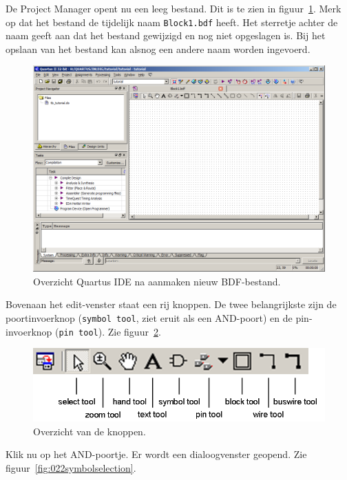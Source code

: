 \documentclass[a4paper,12pt,fleqn,twoside]{book}
\def\tutpicscale{0.455}
\newcommand{\naam}[1]{\texttt{#1}}
\begin{document}
De Project Manager opent nu een leeg bestand. Dit is te zien in
figuur~\ref{fig:018screenwithopenblockfile}. Merk op dat het bestand de
tijdelijk naam \naam{Block1.bdf} heeft.
Het sterretje achter de naam geeft aan dat het bestand gewijzigd en nog niet opgeslagen is.
Bij het opslaan van het bestand kan
alsnog een andere naam worden ingevoerd.

\begin{figure}[H]
\centering
\includegraphics[scale=\tutpicscale]{018screenwithopenblockfile}
\caption{Overzicht Quartus IDE na aanmaken nieuw BDF-bestand.}
\label{fig:018screenwithopenblockfile}
\end{figure}

Bovenaan het edit-venster staat een rij knoppen. De twee belangrijkste zijn
de poortinvoerknop (\naam{symbol tool}, ziet eruit als een AND-poort) en
de pin-invoerknop (\naam{pin tool}).
Zie figuur~\ref{fig:021schematictoolbarcooked}. 

\begin{figure}[H]
\centering
\includegraphics[scale=\tutpicscale]{021schematictoolbarcooked}
\caption{Overzicht van de knoppen.}
\label{fig:021schematictoolbarcooked}
\end{figure}

Klik nu op het AND-poortje. Er wordt een dialoogvenster geopend.
Zie figuur~\ref{fig:022symbolselection}.
\end{document}

